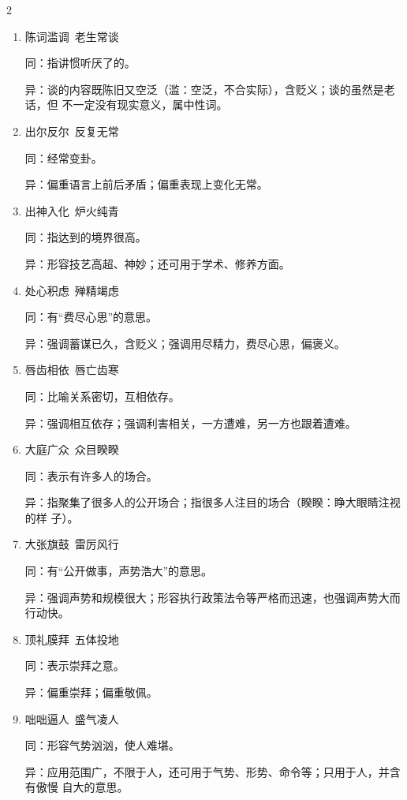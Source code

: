\documentclass[final,oneside]{ctexbook}
\begin{document}
\begin{multicols}{2}
\begin{enumerate}
      异：偏重行动；偏重态度。

    \item 陈词滥调~老生常谈

      同：指讲惯听厌了的。

      异：谈的内容既陈旧又空泛（滥：空泛，不合实际），含贬义；谈的虽然是老话，但
      不一定没有现实意义，属中性词。

    \item 出尔反尔~反复无常

      同：经常变卦。

      异：偏重语言上前后矛盾；偏重表现上变化无常。

    \item 出神入化~炉火纯青

      同：指达到的境界很高。

      异：形容技艺高超、神妙；还可用于学术、修养方面。

    \item 处心积虑~殚精竭虑

      同：有“费尽心思”的意思。

      异：强调蓄谋已久，含贬义；强调用尽精力，费尽心思，偏褒义。

    \item 唇齿相依~唇亡齿寒

      同：比喻关系密切，互相依存。

      异：强调相互依存；强调利害相关，一方遭难，另一方也跟着遭难。

    \item 大庭广众~众目睽睽

      同：表示有许多人的场合。

      异：指聚集了很多人的公开场合；指很多人注目的场合（睽睽：睁大眼睛注视的样
      子）。

    \item 大张旗鼓~雷厉风行

      同：有“公开做事，声势浩大”的意思。

      异：强调声势和规模很大；形容执行政策法令等严格而迅速，也强调声势大而行动快。

    \item 顶礼膜拜~五体投地

      同：表示崇拜之意。

      异：偏重崇拜；偏重敬佩。

    \item 咄咄逼人~盛气凌人

      同：形容气势汹汹，使人难堪。

      异：应用范围广，不限于人，还可用于气势、形势、命令等；只用于人，并含有傲慢
      自大的意思。


\end{enumerate}
\end{multicols}
\end{document}
